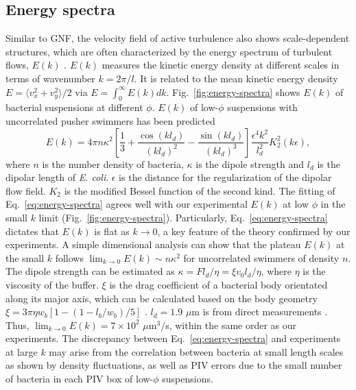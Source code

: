 \documentclass[twocolumn,aps,prx,amsmath,amssymb,longbibliography]{revtex4-2}
\begin{document}
\subsection{Energy spectra}

Similar to GNF, the velocity field of active turbulence also shows scale-dependent structures, which are often characterized by the energy spectrum of turbulent flows, $E(k)$ \cite{Liu2020}. $E(k)$ measures the kinetic energy density at different scales in terms of wavenumber $k = 2\pi/l$. It is related to the mean kinetic energy density $E = \langle v_x^2 + v_y^2 \rangle/2$ via $E = \int_0^\infty E(k)dk$. Fig.~\ref{fig:energy-spectra} shows $E(k)$ of bacterial suspensions at different $\phi$. $E(k)$ of low-$\phi$ suspensions with uncorrelated pusher swimmers has been predicted \cite{Bardfalvy2019}
\begin{equation}
\label{eq:energy-spectra}
E(k) = 4\pi n \kappa^2 \left[ \frac{1}{3} + \frac{\cos(kl_d)}{(kl_d)^2} - \frac{\sin(kl_d)}{(kl_d)^3} \right] \frac{\epsilon^4k^2}{l_d^2} K_2^2(k\epsilon),
\end{equation}
where $n$ is the number density of bacteria, $\kappa$ is the dipole strength and $l_d$ is the dipolar length of \textit{E. coli}. $\epsilon$ is the distance for the regularization of the dipolar flow field. $K_2$ is the modified Bessel function of the second kind.
The fitting of Eq.~\ref{eq:energy-spectra} agrees well with our experimental $E(k)$ at low $\phi$ in the small $k$ limit (Fig.~\ref{fig:energy-spectra}). Particularly, Eq.~\ref{eq:energy-spectra} dictates that $E(k)$ is flat as $k \to 0$, a key feature of the theory confirmed by our experiments. A simple dimensional analysis can show that the plateau $E(k)$ at the small $k$ follows $\lim_{k \to 0}E(k) \sim n \kappa^2$ for uncorrelated swimmers of density $n$. The dipole strength can be estimated as $\kappa = Fl_d/\eta = \xi v_0 l_d/\eta$, where $\eta$ is the viscosity of the buffer. $\xi$ is the drag coefficient of a bacterial body orientated along its major axis, which can be calculated based on the body geometry $\xi = 3\pi\eta w_b \left[1-(1-l_b/w_b)/5\right]$ \cite{Magariyama2002}. $l_d = 1.9$ $\mu$m is from direct measurements \cite{Drescher2011}. Thus, $\lim_{k \to 0}E(k) = 7 \times 10^2$ $\mu$m$^3$/s, within the same order as our experiments. The discrepancy between Eq.~\ref{eq:energy-spectra} and experiments at large $k$ may arise from the correlation between bacteria at small length scales as shown by density fluctuations, as well as PIV errors due to the small number of bacteria in each PIV box of low-$\phi$ suspensions.
\end{document}
